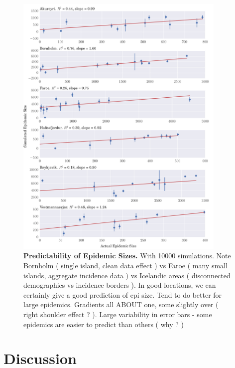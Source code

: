 \documentclass[10pt]{article}
\begin{document}
\begin{figure}[H]
\label{fig_sizes}
\caption{\textbf{Predictability of Epidemic Sizes.} With 10000 simulations. Note Bornholm ( single island, clean data effect ) vs Faroe ( many small islands, aggregate incidence data ) vs Icelandic areas ( disconnected demographics vs incidence borders ). In good locations, we can certainly give a good prediction of epi size. Tend to do better for large epidemics. Gradients all ABOUT one, some slightly over ( right shoulder effect ? ). Large variability in error bars - some epidemics are easier to predict than others ( why ? )}
\centering
\includegraphics[width=0.9\textwidth]{figures/3_sizes.pdf}
\end{figure}















\section*{Discussion}
\end{document}
